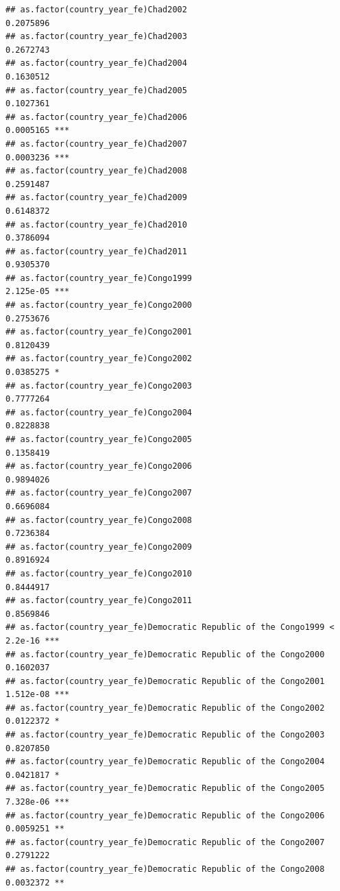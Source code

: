 \documentclass[
  a4paper,
]{article}
\begin{document}
\begin{verbatim}
## as.factor(country_year_fe)Chad2002                             0.2075896    
## as.factor(country_year_fe)Chad2003                             0.2672743    
## as.factor(country_year_fe)Chad2004                             0.1630512    
## as.factor(country_year_fe)Chad2005                             0.1027361    
## as.factor(country_year_fe)Chad2006                             0.0005165 ***
## as.factor(country_year_fe)Chad2007                             0.0003236 ***
## as.factor(country_year_fe)Chad2008                             0.2591487    
## as.factor(country_year_fe)Chad2009                             0.6148372    
## as.factor(country_year_fe)Chad2010                             0.3786094    
## as.factor(country_year_fe)Chad2011                             0.9305370    
## as.factor(country_year_fe)Congo1999                            2.125e-05 ***
## as.factor(country_year_fe)Congo2000                            0.2753676    
## as.factor(country_year_fe)Congo2001                            0.8120439    
## as.factor(country_year_fe)Congo2002                            0.0385275 *  
## as.factor(country_year_fe)Congo2003                            0.7777264    
## as.factor(country_year_fe)Congo2004                            0.8228838    
## as.factor(country_year_fe)Congo2005                            0.1358419    
## as.factor(country_year_fe)Congo2006                            0.9894026    
## as.factor(country_year_fe)Congo2007                            0.6696084    
## as.factor(country_year_fe)Congo2008                            0.7236384    
## as.factor(country_year_fe)Congo2009                            0.8916924    
## as.factor(country_year_fe)Congo2010                            0.8444917    
## as.factor(country_year_fe)Congo2011                            0.8569846    
## as.factor(country_year_fe)Democratic Republic of the Congo1999 < 2.2e-16 ***
## as.factor(country_year_fe)Democratic Republic of the Congo2000 0.1602037    
## as.factor(country_year_fe)Democratic Republic of the Congo2001 1.512e-08 ***
## as.factor(country_year_fe)Democratic Republic of the Congo2002 0.0122372 *  
## as.factor(country_year_fe)Democratic Republic of the Congo2003 0.8207850    
## as.factor(country_year_fe)Democratic Republic of the Congo2004 0.0421817 *  
## as.factor(country_year_fe)Democratic Republic of the Congo2005 7.328e-06 ***
## as.factor(country_year_fe)Democratic Republic of the Congo2006 0.0059251 ** 
## as.factor(country_year_fe)Democratic Republic of the Congo2007 0.2791222    
## as.factor(country_year_fe)Democratic Republic of the Congo2008 0.0032372 ** 

\end{verbatim}
\end{document}
